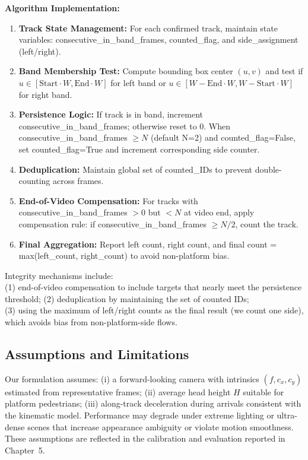 \textbf{Algorithm Implementation:}
\begin{enumerate}
    \item \textbf{Track State Management:} For each confirmed track, maintain state variables: consecutive\_in\_band\_frames, counted\_flag, and side\_assignment (left/right).
    \item \textbf{Band Membership Test:} Compute bounding box center $(u,v)$ and test if $u \in [\text{Start} \cdot W, \text{End} \cdot W]$ for left band or $u \in [W - \text{End} \cdot W, W - \text{Start} \cdot W]$ for right band.
    \item \textbf{Persistence Logic:} If track is in band, increment consecutive\_in\_band\_frames; otherwise reset to 0. When consecutive\_in\_band\_frames $\geq N$ (default N=2) and counted\_flag=False, set counted\_flag=True and increment corresponding side counter.
    \item \textbf{Deduplication:} Maintain global set of counted\_IDs to prevent double-counting across frames.
    \item \textbf{End-of-Video Compensation:} For tracks with consecutive\_in\_band\_frames $> 0$ but $< N$ at video end, apply compensation rule: if consecutive\_in\_band\_frames $\geq N/2$, count the track.
    \item \textbf{Final Aggregation:} Report left count, right count, and final count = max(left\_count, right\_count) to avoid non-platform bias.
\end{enumerate}

Integrity mechanisms include: \\
(1) end-of-video compensation to include targets that nearly meet the persistence threshold; 
(2) deduplication by maintaining the set of counted IDs;\\
(3) using the maximum of left/right counts as the final result (we count one side), which avoids bias from non-platform-side flows.



\subsection{Assumptions and Limitations}
Our formulation assumes: (i) a forward-looking camera with intrinsics $(f,c_x,c_y)$ estimated from representative frames; (ii) average head height $H$ suitable for platform pedestrians; (iii) along-track deceleration during arrivals consistent with the kinematic model. Performance may degrade under extreme lighting or ultra-dense scenes that increase appearance ambiguity or violate motion smoothness. These assumptions are reflected in the calibration and evaluation reported in Chapter~5.

